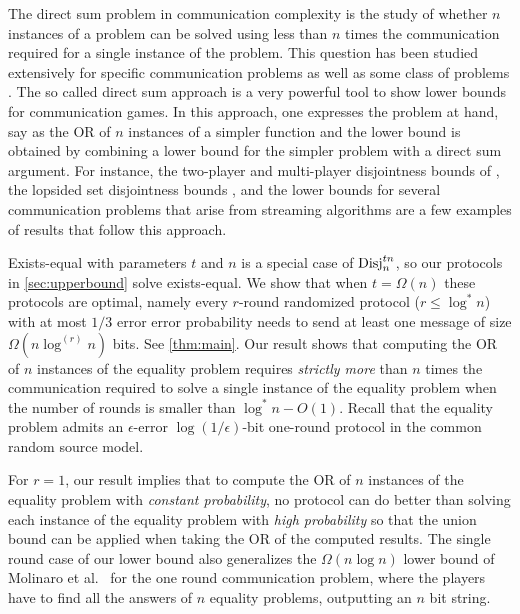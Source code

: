 The direct sum problem in communication complexity is the study
of whether $n$ instances of a problem can be solved using less
than $n$ times the communication required for a single instance
of the problem. This question has been studied extensively for
specific communication problems as well as some class of
problems \cite{ChakrabartiSWY2001, JainRS2003, JainRS2005,
Ben-AroyaRW2008, Gavinsky2008, JainKN2008, HarshaJMR2010, BarakBCR2010}.
The so called direct sum approach is a very powerful tool to
show lower bounds for communication games. In this approach, one
expresses the problem at hand, say as the OR of $n$ instances of
a simpler function and the lower bound is obtained by combining
a lower bound for the simpler problem with a direct sum
argument. For instance, the two-player and multi-player
disjointness bounds of \cite{Bar-YossefJKS2004}, the lopsided set
disjointness bounds \cite{Patrascu2011}, and the lower bounds for
several communication problems that arise from streaming
algorithms \cite{JayramW2009, MagniezMN2010} are a few examples of
results that follow this approach.

Exists-equal with parameters $t$ and $n$ is a special case of
$\operatorname{Disj}_n^{tn}$, so our protocols in \autoref{sec:upperbound}
solve exists-equal. We show that when $t=\Omega(n)$ these
protocols are optimal, namely every $r$-round randomized
protocol ($r\le\log^*n$) with at most $1/3$ error error
probability needs to send at least one message of size
$\Omega(n\log^{(r)}n)$ bits. See \autoref{thm:main}. Our result
shows that computing the OR of $n$ instances of the equality
problem requires {\em strictly more} than $n$ times the
communication required to solve a single instance of the
equality problem when the number of rounds is smaller than
$\log^* n-O(1)$. Recall that the equality problem admits an
$\epsilon$-error $\log(1/\epsilon)$-bit one-round protocol in
the common random source model.

For $r=1$, our result implies that to compute the OR of $n$
instances of the equality problem with {\em constant
probability}, no protocol can do better than solving each
instance of the equality problem with {\em high probability} so
that the union bound can be applied when taking the OR of the
computed results. The single round case of our lower bound also
generalizes the $\Omega(n\log n)$ lower bound of Molinaro et
al.\ \cite{MolinaroWY2013} for the one round communication
problem, where the players have to find all the answers of $n$
equality problems, outputting an $n$ bit string.

